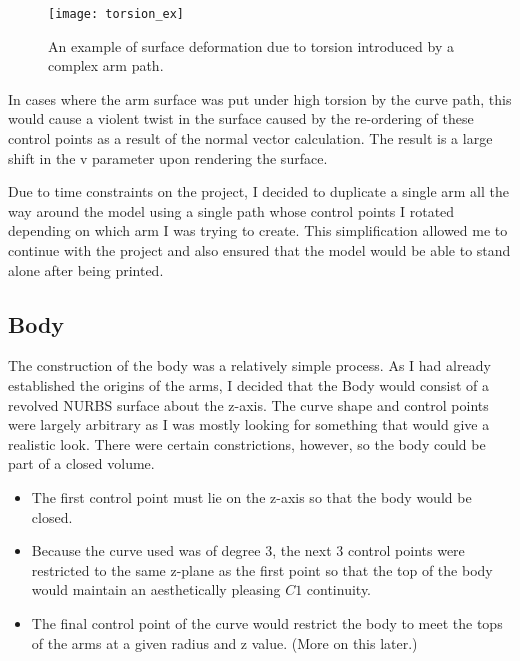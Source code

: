 \documentclass[twocolumn]{article}
\begin{document}
\begin{figure}[h!]
\begin{center}
\texttt{[image: torsion\_ex]}
\caption{An example of surface deformation due to torsion introduced by a complex arm path.}
\end{center}
\end{figure}

In cases where the arm surface was put under high torsion by the curve path, this would cause a violent twist in the surface caused by the re-ordering of these control points as a result of the normal vector calculation. The result is a large shift in the v parameter upon rendering the surface. 

Due to time constraints on the project, I decided to duplicate a single arm all the way around the model using a single path whose control points I rotated depending on which arm I was trying to create. This simplification allowed me to continue with the project and also ensured that the model would be able to stand alone after being printed.
 
\subsection{Body}

The construction of the body was a relatively simple process. As I had already established the origins of the arms, I decided that the Body would consist of a revolved NURBS surface about the z-axis. The curve shape and control points were largely arbitrary as I was mostly looking for something that would give a realistic look. There were certain constrictions, however, so the body could be part of a closed volume. 

\begin{center}
\begin{itemize}
\item The first control point must lie on the z-axis so that the body would be closed.
\item Because the curve used was of degree 3, the next 3 control points were restricted to the same z-plane as the first point so that the top of the body would maintain an aesthetically pleasing $C1$ continuity.
\item The final control point of the curve would restrict the body to meet the tops of the arms at a given radius and z value. (More on this later.)
\end{itemize}
\end{center}
\end{document}
